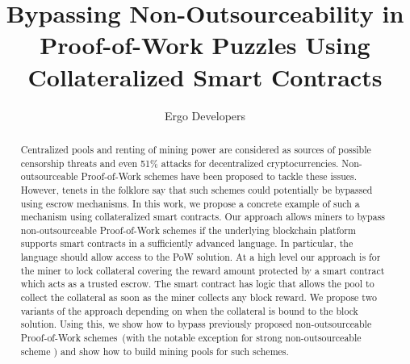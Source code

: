 \documentclass[11pt]{article}
\newcommand{\authnote}[2]{\marginpar{\parbox{\marginparwidth}{\tiny %
  \textsf{#1 {\textcolor{blue}{notes: #2}}}}}%
  \textcolor{blue}{\textbf{\dag}}}
\newcommand{\authnote}[2]{
  \textsf{#1 \textcolor{blue}{: #2}}}
\newcommand{\authnote}[2]{}
\newcommand{\knote}[1]{{\authnote{\textcolor{green}{kushti notes}}{#1}}}
\newcommand{\poolname}{ErgoPool\xspace}
\begin{document}
\title{Bypassing Non-Outsourceability in Proof-of-Work Puzzles Using Collateralized Smart Contracts}
\author{Ergo Developers}
\maketitle

\begin{abstract}
    Centralized pools and renting of mining power are considered as sources of possible censorship threats and even 51\%
    attacks for decentralized cryptocurrencies. Non-outsourceable Proof-of-Work schemes have been proposed to tackle these issues. However, tenets in the folklore say that such schemes could potentially be bypassed using escrow mechanisms.
    In this work, we propose a concrete example of such a mechanism using collateralized smart contracts. Our approach allows miners to bypass non-outsourceable Proof-of-Work schemes 
    if the underlying blockchain platform supports smart contracts in a sufficiently advanced language. In particular, the language
    should allow access to the PoW solution.
    At a high level our approach is for the miner to lock collateral covering the reward amount protected by a smart contract which acts as a trusted escrow. The smart contract has logic that allows the pool to collect the collateral as soon as the miner collects any block reward. We propose two variants of the approach depending on when the collateral is bound to the block solution. Using this, we show how to bypass
    previously proposed non-outsourceable Proof-of-Work schemes~(with the notable exception for strong non-outsourceable scheme
    \knote{link}) and show how to build mining pools for such schemes.

\end{abstract}
\end{document}

